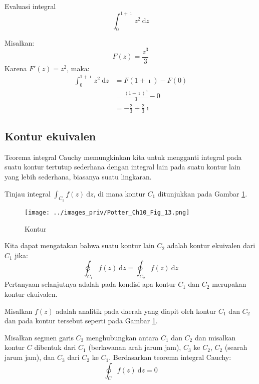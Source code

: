 \begin{contoh}
Evaluasi integral
\begin{equation*}
\int_{0}^{1 + \imath}z^{2}\ \mathrm{d}z
\end{equation*}
\end{contoh}

Misalkan:
\begin{equation*}
F(z)=\frac{z^{3}}{3}
\end{equation*}
Karena $F'(z) = z^{2}$, maka:
\begin{align*}
\int_{0}^{1+\imath}z^{2}\ \mathrm{d}z & = F(1 + \imath) - F(0)\\
 & =\frac{(1+\imath)^{3}}{3}-0\\
 & =-\frac{2}{3}+\frac{2}{3}\imath
\end{align*}


\subsection{Kontur ekuivalen}

Teorema integral Cauchy memungkinkan kita untuk mengganti integral
pada suatu kontur tertutup sederhana dengan integral lain pada suatu
kontur lain yang lebih sederhana, biasanya suatu lingkaran.

Tinjau integral $\int_{C_{1}}f(z)\ \mathrm{d}z$, di mana kontur $C_{1}$
ditunjukkan pada Gambar \ref{fig:Potter_Fig_10_13}.

\begin{figure}[h]
{\centering
\texttt{[image: ../images\_priv/Potter\_Ch10\_Fig\_13.png]}
\par}
\caption{Kontur}\label{fig:Potter_Fig_10_13}
\end{figure}

Kita dapat mengatakan bahwa suatu kontur lain $C_{2}$ adalah kontur
ekuivalen dari $C_{1}$ jika:
\begin{equation*}
\oint_{C_{1}}f(z)\ \mathrm{d}z=\oint_{C_{2}}f(z)\ \mathrm{d}z
\end{equation*}
Pertanyaan selanjutnya adalah pada kondisi apa kontur $C_{1}$ dan
$C_{2}$ merupakan kontur ekuivalen.

Misalkan $f(z)$ adalah analitik pada daerah yang diapit oleh kontur
$C_{1}$ dan $C_{2}$ dan pada kontur tersebut seperti pada Gambar
\ref{fig:Potter_Fig_10_13}.

Misalkan segmen garis $C_{3}$ menghubungkan antara $C_{1}$ dan $C_{2}$
dan misalkan kontur $C$ dibentuk dari $C_{1}$ (berlawanan arah jarum
jam), $C_{3}$ ke $C_{2}$, $C_{2}$ (searah jarum jam), dan $C_{3}$
dari $C_{2}$ ke $C_{1}$. Berdasarkan teorema integral Cauchy:
\begin{equation*}
\oint_{C}f(z)\ \mathrm{d}z=0
\end{equation*}

